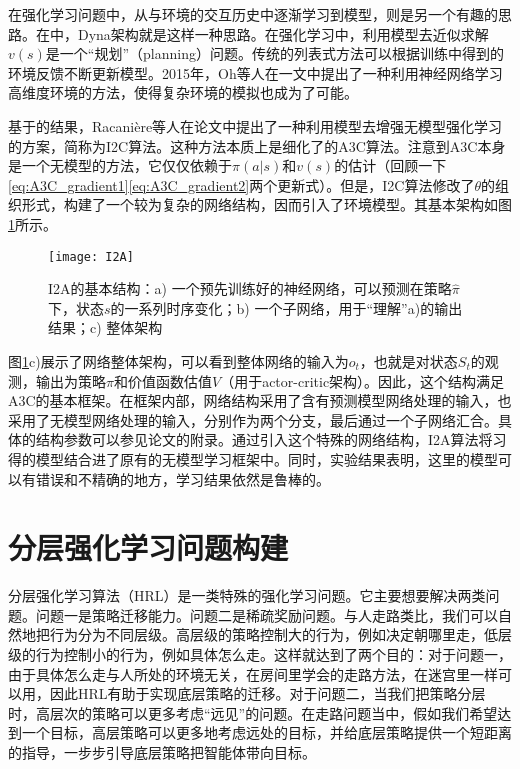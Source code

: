       在强化学习问题中，从与环境的交互历史中逐渐学习到模型，则是另一个有趣的思路。在\cite{Sutton_book}中，Dyna架构就是这样一种思路。在强化学习中，利用模型去近似求解$v(s)$是一个``规划''（planning）问题。传统的列表式方法可以根据训练中得到的环境反馈不断更新模型。2015年，Oh等人在\cite{action-conditional_prediction}一文中提出了一种利用神经网络学习高维度环境的方法，使得复杂环境的模拟也成为了可能。\par 
      基于\cite{action-conditional_prediction}的结果，Racani\`{e}re等人在论文\cite{I2A}中提出了一种利用模型去增强无模型强化学习的方案，简称为I2C算法。这种方法本质上是细化了的A3C算法。注意到A3C本身是一个无模型的方法，它仅仅依赖于$\pi(a|s)$和$v(s)$的估计（回顾一下\eqref{eq:A3C_gradient1}\eqref{eq:A3C_gradient2}两个更新式）。但是，I2C算法修改了$\theta$的组织形式，构建了一个较为复杂的网络结构，因而引入了环境模型。其基本架构如图\ref{fig:I2A}所示。
      \begin{figure}[H] %
        \centering
        \texttt{[image: I2A]}
        \caption{I2A的基本结构：a) 一个预先训练好的神经网络，可以预测在策略$\hat{\pi}$下，状态$s$的一系列时序变化；b) 一个子网络，用于``理解''a)的输出结果；c) 整体架构}
        \label{fig:I2A}
      \end{figure}
      \par 图\ref{fig:I2A}c)展示了网络整体架构，可以看到整体网络的输入为$o_t$，也就是对状态$S_t$的观测，输出为策略$\pi$和价值函数估值$V$（用于actor-critic架构）。因此，这个结构满足A3C的基本框架。在框架内部，网络结构采用了含有预测模型网络处理的输入，也采用了无模型网络处理的输入，分别作为两个分支，最后通过一个子网络汇合。具体的结构参数可以参见论文\cite{I2A}的附录。通过引入这个特殊的网络结构，I2A算法将习得的模型结合进了原有的无模型学习框架中。同时，实验结果表明，这里的模型可以有错误和不精确的地方，学习结果依然是鲁棒的。
    
\section{分层强化学习问题构建}
分层强化学习算法（HRL）是一类特殊的强化学习问题。它主要想要解决两类问题。问题一是策略迁移能力。问题二是稀疏奖励问题。与人走路类比，我们可以自然地把行为分为不同层级。高层级的策略控制大的行为，例如决定朝哪里走，低层级的行为控制小的行为，例如具体怎么走。这样就达到了两个目的：对于问题一，由于具体怎么走与人所处的环境无关，在房间里学会的走路方法，在迷宫里一样可以用，因此HRL有助于实现底层策略的迁移。对于问题二，当我们把策略分层时，高层次的策略可以更多考虑``远见''的问题。在走路问题当中，假如我们希望达到一个目标，高层策略可以更多地考虑远处的目标，并给底层策略提供一个短距离的指导，一步步引导底层策略把智能体带向目标。

